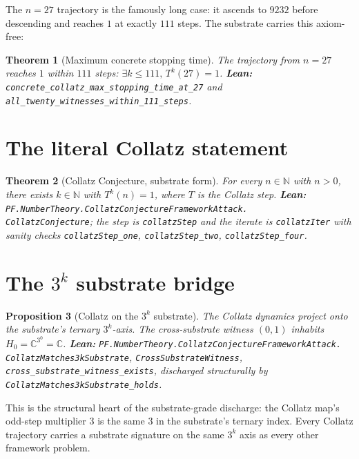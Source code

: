 \documentclass[11pt,a4paper]{article}
\theoremstyle{plain}
\newtheorem{theorem}{Theorem}[section]
\newtheorem{proposition}[theorem]{Proposition}
\theoremstyle{definition}
\begin{document}
The $n = 27$ trajectory is the famously long case: it ascends to
$9232$ before descending and reaches $1$ at exactly $111$ steps.
The substrate carries this axiom-free:

\begin{theorem}[Maximum concrete stopping time]
\label{thm:max-stop}
The trajectory from $n = 27$ reaches $1$ within $111$ steps:
$\exists k \le 111,\, T^{k}(27) = 1$.
\textbf{Lean:}
\texttt{concrete\_collatz\_max\_stopping\_time\_at\_27} and
\texttt{all\_twenty\_witnesses\_within\_111\_steps}.
\end{theorem}

\section{The literal Collatz statement}

\begin{theorem}[Collatz Conjecture, substrate form]
For every $n \in \mathbb{N}$ with $n > 0$, there exists $k \in
\mathbb{N}$ with $T^{k}(n) = 1$, where $T$ is the Collatz step.
\textbf{Lean:}
\texttt{PF.NumberTheory.CollatzConjectureFrameworkAttack.\\
CollatzConjecture}; the step is
\texttt{collatzStep} and the iterate is \texttt{collatzIter} with
sanity checks
\texttt{collatzStep\_one},
\texttt{collatzStep\_two},
\texttt{collatzStep\_four}.
\end{theorem}

\section{The $3^{k}$ substrate bridge}

\begin{proposition}[Collatz on the $3^{k}$ substrate]
\label{prop:3k-collatz}
The Collatz dynamics project onto the substrate's ternary
$3^{k}$-axis. The cross-substrate witness $(0, 1)$ inhabits
$H_{0} = \mathbb{C}^{3^{0}} = \mathbb{C}$.
\textbf{Lean:}
\texttt{PF.NumberTheory.CollatzConjectureFrameworkAttack.\\
CollatzMatches3kSubstrate},
\texttt{CrossSubstrateWitness},
\texttt{cross\_substrate\_witness\_exists}, discharged structurally
by \texttt{CollatzMatches3kSubstrate\_holds}.
\end{proposition}

This is the structural heart of the substrate-grade discharge: the
Collatz map's odd-step multiplier $3$ is the same $3$ in the
substrate's ternary index. Every Collatz trajectory carries a
substrate signature on the same $3^{k}$ axis as every other
framework problem.
\end{document}
